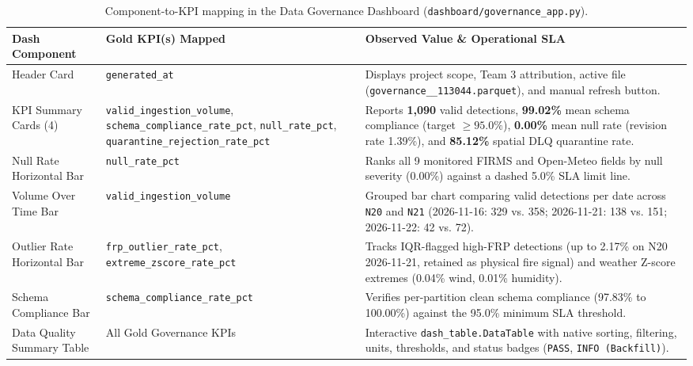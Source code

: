 \documentclass[11pt,a4paper]{article}
\begin{document}
\begin{table}[htbp]
\centering
\footnotesize
\begin{tabularx}{\textwidth}{>{\RaggedRight\arraybackslash}p{3.0cm} >{\RaggedRight\arraybackslash}p{3.8cm} >{\RaggedRight\arraybackslash}X}
\toprule
\textbf{Dash Component} & \textbf{Gold KPI(s) Mapped} & \textbf{Observed Value \& Operational SLA} \\
\midrule
Header Card & \texttt{generated\_at} & Displays project scope, Team 3 attribution, active file (\texttt{governance\_\allowbreak 20261128\_\allowbreak 113044.parquet}), and manual refresh button. \\
\addlinespace[3pt]
KPI Summary Cards (4) & \texttt{valid\_\allowbreak ingestion\_\allowbreak volume}, \texttt{schema\_\allowbreak compliance\_\allowbreak rate\_\allowbreak pct}, \texttt{null\_\allowbreak rate\_\allowbreak pct}, \texttt{quarantine\_\allowbreak rejection\_\allowbreak rate\_\allowbreak pct} & Reports \textbf{1,090} valid detections, \textbf{99.02\%} mean schema compliance (target $\ge 95.0\%$), \textbf{0.00\%} mean null rate (revision rate 1.39\%), and \textbf{85.12\%} spatial DLQ quarantine rate. \\
\addlinespace[3pt]
Null Rate Horizontal Bar & \texttt{null\_\allowbreak rate\_\allowbreak pct} & Ranks all 9 monitored FIRMS and Open-Meteo fields by null severity (0.00\%) against a dashed 5.0\% SLA limit line. \\
\addlinespace[3pt]
Volume Over Time Bar & \texttt{valid\_\allowbreak ingestion\_\allowbreak volume} & Grouped bar chart comparing valid detections per date across \texttt{N20} and \texttt{N21} (2026-11-16: 329 vs. 358; 2026-11-21: 138 vs. 151; 2026-11-22: 42 vs. 72). \\
\addlinespace[3pt]
Outlier Rate Horizontal Bar & \texttt{frp\_\allowbreak outlier\_\allowbreak rate\_\allowbreak pct}, \texttt{extreme\_\allowbreak zscore\_\allowbreak rate\_\allowbreak pct} & Tracks IQR-flagged high-FRP detections (up to 2.17\% on N20 2026-11-21, retained as physical fire signal) and weather Z-score extremes (0.04\% wind, 0.01\% humidity). \\
\addlinespace[3pt]
Schema Compliance Bar & \texttt{schema\_\allowbreak compliance\_\allowbreak rate\_\allowbreak pct} & Verifies per-partition clean schema compliance (97.83\% to 100.00\%) against the 95.0\% minimum SLA threshold. \\
\addlinespace[3pt]
Data Quality Summary Table & All Gold Governance KPIs & Interactive \texttt{dash\_table.DataTable} with native sorting, filtering, units, thresholds, and status badges (\texttt{PASS}, \texttt{INFO (Backfill)}). \\
\bottomrule
\end{tabularx}
\caption{Component-to-KPI mapping in the Data Governance Dashboard (\texttt{dashboard/governance\_app.py}).}
\label{tab:gov_mapping}
\end{table}
\end{document}
